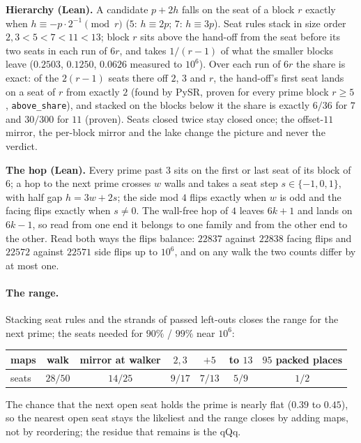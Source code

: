 \documentclass[11pt]{article}
\begin{document}
\textbf{Hierarchy (Lean).} A candidate $p+2h$ falls on the seat of a block $r$ exactly when $h \equiv -p\cdot2^{-1} \pmod r$ ($5$: $h\equiv2p$; $7$: $h\equiv3p$). Seat rules stack in size order $2,3 < 5 < 7 < 11 < 13$; block $r$ sits above the hand-off from the seat before its two seats in each run of $6r$, and takes $1/(r-1)$ of what the smaller blocks leave ($0.2503$, $0.1250$, $0.0626$ measured to $10^6$). Over each run of $6r$ the share is exact: of the $2(r-1)$ seats there off $2$, $3$ and $r$, the hand-off's first seat lands on a seat of $r$ from exactly $2$ (found by PySR, proven for every prime block $r\ge5$, \texttt{above\_share}), and stacked on the blocks below it the share is exactly $6/36$ for $7$ and $30/300$ for $11$ (proven). Seats closed twice stay closed once; the offset-$11$ mirror, the per-block mirror and the lake change the picture and never the verdict.

\textbf{The hop (Lean).} Every prime past $3$ sits on the first or last seat of its block of $6$; a hop to the next prime crosses $w$ walls and takes a seat step $s\in\{-1,0,1\}$, with half gap $h = 3w+2s$; the side mod $4$ flips exactly when $w$ is odd and the facing flips exactly when $s\neq0$. The wall-free hop of $4$ leaves $6k+1$ and lands on $6k-1$, so read from one end it belongs to one family and from the other end to the other. Read both ways the flips balance: $22837$ against $22838$ facing flips and $22572$ against $22571$ side flips up to $10^6$, and on any walk the two counts differ by at most one.

\paragraph{The range.} Stacking seat rules and the strands of passed left-outs closes the range for the next prime; the seats needed for $90\%$ / $99\%$ near $10^6$:
\begin{center}\begin{tabular}{lcccccc}\toprule
maps & walk & mirror at walker & $2,3$ & $+5$ & to $13$ & $95$ packed places\\\midrule
seats & $28/50$ & $14/25$ & $9/17$ & $7/13$ & $5/9$ & $1/2$\\\bottomrule
\end{tabular}\end{center}
The chance that the next open seat holds the prime is nearly flat ($0.39$ to $0.45$), so the nearest open seat stays the likeliest and the range closes by adding maps, not by reordering; the residue that remains is the qQq.
\end{document}
